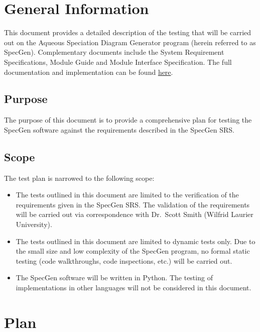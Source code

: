 \documentclass[12pt, titlepage]{article}
\newcommand{\progname}{SpecGen}
\begin{document}
\newpage



\setcounter{secnumdepth}{3}

\section{General Information}

This document provides a detailed description of the testing that will be 
carried out on the Aqueous Speciation Diagram Generator program (herein referred 
to as \progname{}).  Complementary documents include the 
System Requirement Specifications, Module Guide and Module Interface Specification.  
The full documentation and 
implementation can be found \href{https://github.com/palmerst/cas741_sp}{here}.

\subsection{Purpose}
The purpose of this document is to provide a comprehensive plan for testing the 
\progname{} software against the requirements described in the
\progname{} SRS.  

\subsection{Scope}
The test plan is narrowed to the following scope:
\begin{itemize}
\item The tests outlined in this document are limited to the verification of the 
  requirements given in the \progname{} SRS.  The validation of the requirements 
  will be carried out via correspondence with Dr.\ Scott Smith 
  (Wilfrid Laurier University).
\item The tests outlined in this document are limited to dynamic tests only.  
  Due to the small size and low complexity of the \progname{} program, no formal
  static testing (code walkthroughs, code inspections, etc.) will be carried out.
\item The \progname{} software will be written in Python.  The testing of 
  implementations in other languages will not be considered in this document.
\end{itemize}

\section{Plan}
\label{SecPlan}
	
\end{document}
